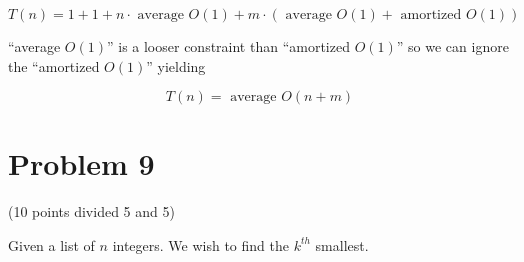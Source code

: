 \documentclass{article}
\begin{document}
\begin{enumerate}[label=(\alph*)]
\begin{equation*}
  T(n) = 1 + 1 + n \cdot \text{ average } O(1)
         + m \cdot (\text{ average } O(1) + \text{ amortized } O(1))
\end{equation*}

``average $O(1)$'' is a looser constraint than ``amortized $O(1)$'' 
so we can ignore the ``amortized $O(1)$'' yielding

\begin{equation}
  \boxed{T(n) = \text{ average } O(n + m)}
\end{equation}

\end{enumerate}

\newpage

\section{Problem 9}

(10 points divided 5 and 5)

Given a list of $n$ integers.  We wish to find the $k^{th}$ smallest.
\end{document}
